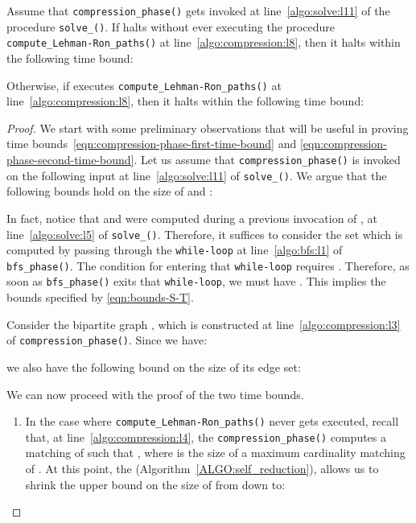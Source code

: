 \begin{lemma}\label{lemma:complexity_compression_phase}
Assume that \texttt{compression\_phase()} gets invoked at line~\ref{algo:solve:l11} of
the procedure \texttt{solve\_\mainproblem()}. If  halts without ever executing
the procedure \texttt{compute\_Lehman-Ron\_paths()} at line~\ref{algo:compression:l8},
then it halts within the following time bound:

Otherwise, if  executes
\texttt{compute\_Lehman-Ron\_paths()} at line~\ref{algo:compression:l8},
then it halts within the following time bound:

\end{lemma}
\begin{proof}
We start with some preliminary observations that will be useful in proving time
bounds~\eqref{eqn:compression-phase-first-time-bound} and \eqref{eqn:compression-phase-second-time-bound}.
Let us assume that \texttt{compression\_phase()} is
invoked on the following input 
at line~\ref{algo:solve:l11} of \texttt{solve\_\mainproblem()}.
We argue that the following bounds hold on the size of  and :

In fact, notice that  and  were computed during a previous invocation of ,
at line~\ref{algo:solve:l5} of \texttt{solve\_\mainproblem()}.
Therefore, it suffices to consider the set  which is computed by passing through the
\texttt{while-loop} at line~\ref{algo:bfs:l1} of \texttt{bfs\_phase()}.
The condition for entering that \texttt{while-loop} requires .
Therefore, as soon as \texttt{bfs\_phase()} exits that \texttt{while-loop}, we must have .
This implies the bounds specified by \eqref{eqn:bounds-S-T}.

Consider the bipartite graph , which is constructed
at line~\ref{algo:compression:l3} of \texttt{compression\_phase()}.
Since we have:

we also have the following bound on the size of its edge set:


We can now proceed with the proof of the two time bounds.

\begin{enumerate}
    \item In the case where  \texttt{compute\_Lehman-Ron\_paths()} never gets executed,
    recall that, at line~\ref{algo:compression:l4}, the \texttt{compression\_phase()}
computes a matching  of  such that , where  is the
size of a maximum cardinality matching of .
At this point, the  (Algorithm~\ref{ALGO:self_reduction}),
allows us to shrink the upper bound on the size of  from  down to:


\end{enumerate}
\end{proof}
